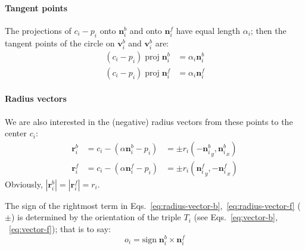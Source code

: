 \documentclass{article}
\begin{document}
\paragraph{Tangent points}
%
The projections of $c_{i}-p_{i}$ onto $\mathbf{n}^{b}_{i}$ and onto $\mathbf{n}^{f}_{i}$ have equal length $\alpha_i$; then the tangent points of the circle on $\mathbf{v}^{b}_{i}$ and $\mathbf{v}^{b}_{i}$ are:
%
\begin{align}
  \label{eq:alpha-vector-b}
  \left(c_{i}-p_{i}\right)\;\mathrm{proj}\; \mathbf{n}^{b}_{i} &= \alpha_i\mathbf{n}^{b}_{i}\\
  \label{eq:alpha-vector-f}
  \left(c_{i}-p_{i}\right)\;\mathrm{proj}\; \mathbf{n}^{f}_{i} &= \alpha_i\mathbf{n}^{f}_{i}
\end{align}
%
\paragraph{Radius vectors}
%
We are also interested in the (negative) radius vectors from these points to the center $c_{i}$:
%
\begin{align}
  \label{eq:radius-vector-b}
  \mathbf{r}^{b}_{i} &= c_{i} - \left(\alpha\mathbf{n}^{b}_{i} - p_{i}\right)&=\pm r_i\left( -{\mathbf{n}^{b}_{i}}_{y},  {\mathbf{n}^{b}_{i}}_{x} \right)\\
  \label{eq:radius-vector-f}
  \mathbf{r}^{f}_{i} &= c_{i} - \left(\alpha\mathbf{n}^{f}_{i} - p_{i}\right)&=\pm r_i\left(  {\mathbf{n}^{f}_{i}}_{y}, -{\mathbf{n}^{f}_{i}}_{x} \right)
\end{align}
%
Obviously, $\left|\mathbf{r}^{b}_{i}\right| = \left|\mathbf{r}^{f}_{i}\right| = r_{i}$.

The sign of the rightmost term in Eqs.~\eqref{eq:radius-vector-b},~\eqref{eq:radius-vector-f} ($\pm$) is determined by the orientation of the triple $T_i$ (see Eqs.~\eqref{eq:vector-b}, ~\eqref{eq:vector-f}); that is to say:
%
\begin{equation}
  \label{eq:orientation}
  o_i = \mathrm{sign}\; \mathbf{n}^{b}_{i} \times \mathbf{n}^{f}_{i}
\end{equation}
%
\end{document}

